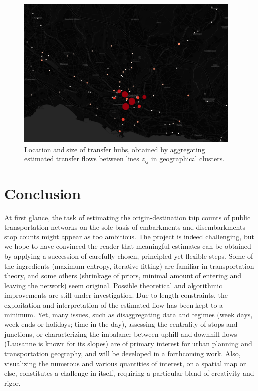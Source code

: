 \documentclass{bmcart}
\begin{document}
\begin{figure}[h]
	\includegraphics[width=0.97\textwidth]{fig/transfers.png}
	\caption{Location and size of transfer hubs, obtained by aggregating estimated transfer flows between lines $z_{ij}$ in geographical clusters.}
	\label{transfers}
\end{figure}


\section{Conclusion}
\label{conclusion}
At first glance, the task of estimating the origin-destination trip counts of public transportation networks on the sole basis of embarkments and disembarkments stop counts might appear as too ambitious. The project is indeed challenging, but we hope to have convinced the reader that meaningful estimates can be obtained by applying a succession of carefully chosen, principled yet flexible steps. Some of the ingredients (maximum entropy, iterative fitting) are familiar in transportation theory, and some others (shrinkage of priors, minimal amount of entering and leaving the network) seem original. Possible theoretical and algorithmic improvements are still under investigation.
Due to length constraints, the exploitation and interpretation of the estimated flow has been kept to a minimum. Yet, many issues, such as disaggregating data and regimes (week days, week-ends or holidays; time in the day), assessing the centrality of stops and junctions, or characterizing the imbalance between uphill and downhill flows (Lausanne is known for its slopes) are of primary interest for urban planning and transportation geography, and will be developed in a forthcoming work. Also, visualizing the numerous and various quantities of interest, on a spatial map or else, constitutes a challenge in itself, requiring a particular blend of creativity and rigor.
\end{document}
